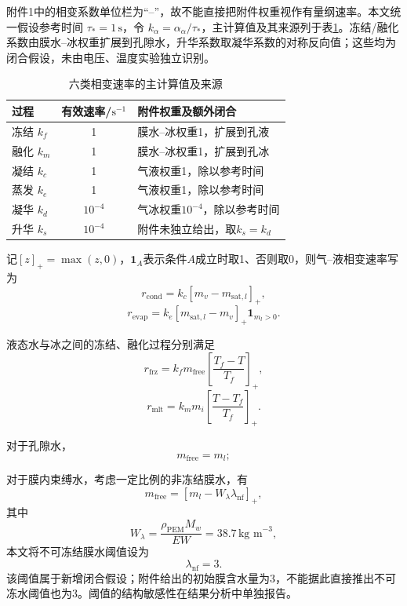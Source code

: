 \documentclass[bwprint]{gmcmthesis}
\numberwithin{equation}{section}
\numberwithin{figure}{section}
\begin{document}
\begin{itemize}
附件1中的相变系数单位栏为“--”，故不能直接把附件权重视作有量纲速率。本文统一假设参考时间 $\tau_*=1\,\mathrm s$，令 $k_\alpha=\alpha_\alpha/\tau_*$，主计算值及其来源列于表\ref{tab:q1_phase_rates}。冻结/融化系数由膜水--冰权重扩展到孔隙水，升华系数取凝华系数的对称反向值；这些均为闭合假设，未由电压、温度实验独立识别。
\begin{table}[htbp]
\centering
\caption{六类相变速率的主计算值及来源}
\label{tab:q1_phase_rates}
\small
\begin{tabular}{lcl}
\toprule
过程 & 有效速率/$\mathrm{s^{-1}}$ & 附件权重及额外闭合 \\
\midrule
冻结 $k_f$ & 1 & 膜水--冰权重1，扩展到孔液 \\
融化 $k_m$ & 1 & 膜水--冰权重1，扩展到孔冰 \\
凝结 $k_c$ & 1 & 气液权重1，除以参考时间 \\
蒸发 $k_e$ & 1 & 气液权重1，除以参考时间 \\
凝华 $k_d$ & $10^{-4}$ & 气冰权重$10^{-4}$，除以参考时间 \\
升华 $k_s$ & $10^{-4}$ & 附件未独立给出，取$k_s=k_d$ \\
\bottomrule
\end{tabular}
\end{table}

记$[z]_+=\max(z,0)$，$\mathbf1_A$表示条件$A$成立时取1、否则取0，则气--液相变速率写为
\begin{equation}
r_{\text{cond}} = k_c [m_v - m_{\text{sat},l}]_+, \label{eq:src:4-28}
\end{equation}
\begin{equation}
r_{\text{evap}} = k_e [m_{\text{sat},l} - m_v]_+ \mathbf{1}_{m_l > 0}. \label{eq:src:4-29}
\end{equation}

 液态水与冰之间的冻结、融化过程分别满足
\begin{equation}
r_{\text{frz}} = k_f m_{\text{free}} \left[ \frac{T_f - T}{T_f} \right]_+, \label{eq:src:4-30}
\end{equation}
\begin{equation}
r_{\text{mlt}} = k_m m_i \left[ \frac{T - T_f}{T_f} \right]_+. \label{eq:src:4-31}
\end{equation}

 对于孔隙水，
\[
m_{\text{free}} = m_l;
\]
{对于膜内束缚水，考虑一定比例的非冻结膜水，有
\[
m_{\text{free}} = [m_l - W_\lambda \lambda_{\text{nf}}]_+,
\]
 其中
\[
W_\lambda = \frac{\rho_{\text{PEM}} M_w}{EW} = 38.7 \, \text{kg m}^{-3},
\]
 本文将不可冻结膜水阈值设为
\[
\lambda_{\text{nf}} = 3.
\]
该阈值属于新增闭合假设；附件给出的初始膜含水量为3，不能据此直接推出不可冻水阈值也为3。阈值的结构敏感性在结果分析中单独报告。

}
\end{itemize}
\end{document}
